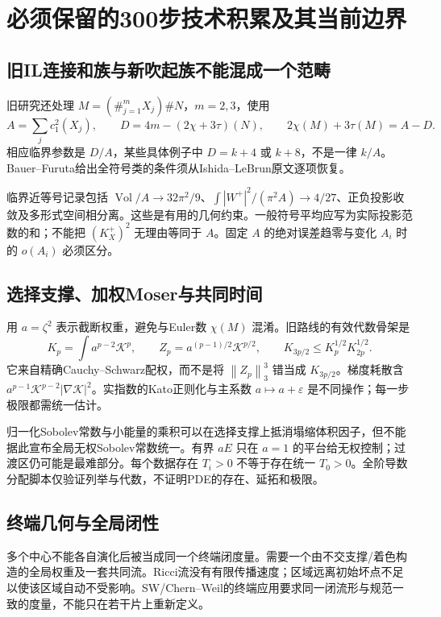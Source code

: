 \documentclass[UTF8,a4paper,11pt,fontset=fandol]{ctexart}
\numberwithin{equation}{section}
\theoremstyle{definition}
\newcommand{\Vol}{\operatorname{Vol}}
\newcommand{\norm}[1]{\left\lVert#1\right\rVert}
\begin{document}
\section{必须保留的300步技术积累及其当前边界}
\subsection{旧IL连接和族与新吹起族不能混成一个范畴}
旧研究还处理 $M=(\#_{j=1}^{m}X_j)\#N$，$m=2,3$，使用
\[
A=\sum_j c_1^2(X_j),\qquad D=4m-(2\chi+3\tau)(N),\qquad
2\chi(M)+3\tau(M)=A-D.
\]
相应临界参数是 $D/A$，某些具体例子中 $D=k+4$ 或 $k+8$，不是一律 $k/A$。Bauer--Furuta给出全符号类的条件须从Ishida--LeBrun原文逐项恢复\cite{IL}。

临界近等号记录包括 $\Vol/A\to32\pi^2/9$、$\int|W^+|^2/(\pi^2A)\to4/27$、正负投影收敛及多形式空间相分离。这些是有用的几何约束。一般符号平均应写为实际投影范数的和；不能把 $(K_X^+)^2$ 无理由等同于 $A$。固定 $A$ 的绝对误差趋零与变化 $A_i$ 时的 $o(A_i)$ 必须区分。

\subsection{选择支撑、加权Moser与共同时间}
用 $a=\zeta^2$ 表示截断权重，避免与Euler数 $\chi(M)$ 混淆。旧路线的有效代数骨架是
\[
K_p=\int a^{p-2}\mathcal K^p,\qquad
Z_p=a^{(p-1)/2}\mathcal K^{p/2},\qquad
K_{3p/2}\le K_p^{1/2}K_{2p}^{1/2}.
\]
它来自精确Cauchy--Schwarz配权，而不是将 $\norm{Z_p}_3^3$ 错当成 $K_{3p/2}$。梯度耗散含 $a^{p-1}\mathcal K^{p-2}|\nabla\mathcal K|^2$。实指数的Kato正则化与主系数 $a\mapsto a+\varepsilon$ 是不同操作；每一步极限都需统一估计。

归一化Sobolev常数与小能量的乘积可以在选择支撑上抵消塌缩体积因子，但不能据此宣布全局无权Sobolev常数统一。有界 $aE$ 只在 $a=1$ 的平台给无权控制；过渡区仍可能是最难部分。每个数据存在 $T_i>0$ 不等于存在统一 $T_0>0$。全阶导数分配脚本仅验证列举与代数，不证明PDE的存在、延拓和极限。

\subsection{终端几何与全局闭性}
多个中心不能各自演化后被当成同一个终端闭度量。需要一个由不交支撑/着色构造的全局权重及一套共同流。Ricci流没有有限传播速度；区域远离初始坏点不足以使该区域自动不受影响。SW/Chern--Weil的终端应用要求同一闭流形与规范一致的度量，不能只在若干片上重新定义。
\end{document}

